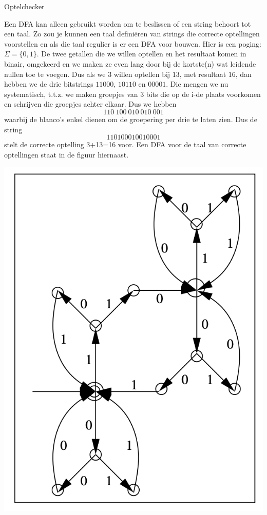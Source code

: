 \begin{theo}[Optelchecker]{Optelchecker}
    \begin{minipage}{.75\textwidth}
        Een DFA kan alleen gebruikt worden om te beslissen of een string behoort tot een taal.
        Zo zou je kunnen een taal definiëren van strings die correcte optellingen voorstellen en als die taal regulier is er een DFA voor bouwen.
        Hier is een poging: $\Sigma = \{0,1\}$. De twee getallen  die we willen optellen en het resultaat komen in binair, omgekeerd en we maken ze even lang door bij de kortste(n) wat leidende nullen toe te voegen.
        Dus als we $3$ willen optellen bij $13$, met resultaat $16$, dan hebben we de drie bitstrings $11000$, $10110$ en $00001$. Die mengen we nu systematisch,
        t$.$t$.$z$.$ we maken groepjes van $3$ bits die op de i-de plaats voorkomen en schrijven die groepjes achter elkaar. Dus we hebben 
        \begin{equation*}
            110  \ 100 \ 010 \ 010 \ 001
        \end{equation*}
        waarbij de blanco’s enkel dienen om de groepering per drie te laten zien. Dus de string 
        \begin{equation*}
            110100010010001
        \end{equation*}
        stelt de correcte optelling 3+13=16 voor.
        Een DFA voor de taal van correcte optellingen staat in de figuur hiernaast.
    \end{minipage}
    \begin{minipage}{.21\textwidth}
        \vspace{-0.3cm}\includegraphics[scale = 0.35]{Images/Optelchecker.png}

\end{minipage}
\end{theo}
